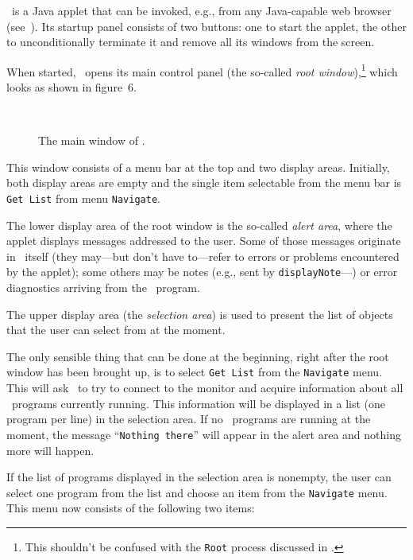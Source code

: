 \dsd\ is a Java applet that can be invoked, e.g., from any Java-capable
web browser (see~).
Its startup panel consists of two buttons: one to start the applet, the
other to unconditionally terminate it and remove all its windows
from the screen.

When started, \dsd\ opens its main control panel (the so-called
{\em root window\/}),\footnote{This shouldn't be confused with the
{\tt Root} process discussed in .}
which looks as shown in
figure~6.

\begin{figure}
\begin{center}
\ 
\caption{The main window of \dsd.}%
\end{center}
\end{figure}

This window consists of a menu bar at the top and two display areas.
Initially, both display areas are empty and the single item selectable
from the menu bar is {\tt Get~List} from menu {\tt Navigate}.

The lower display area of the root window is the so-called
{\em alert area}, where the applet displays messages addressed to the user.
Some of those messages originate in \dsd\ itself (they may---but don't
have to---refer to errors or problems encountered by the applet);
some others may be
notes (e.g., sent by {\tt displayNote}---) or error
diagnostics arriving from the \smurph\ program.

The upper display area (the {\em selection area\/}) is used to present
the list of objects that the user can select from at the moment.

The only sensible thing that can be done at the beginning, right after the
root window has been brought up, is to select {\tt Get~List} from the
{\tt Navigate} menu.
This will ask \dsd\ to try to connect to the monitor and acquire information
about all \smurph\ programs currently running.
This information will be displayed in a list (one program per line) in
the selection area.
If no \smurph\ programs are running at the moment, the message
``{\tt Nothing there}'' will appear in the alert area and nothing more
will happen.

If the list of programs displayed in the selection area is nonempty, the
user can select one program from the list and choose an item
from the {\tt Navigate} menu.
This menu now consists of the following two items:
\medskip

